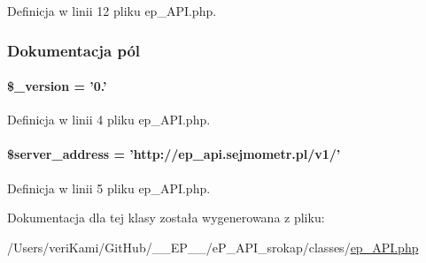 Definicja w linii 12 pliku ep\-\_\-\-A\-P\-I.\-php.



\subsubsection{Dokumentacja pól}
\hypertarget{classep___api_a01caaf3772469caf98e39064bf5d7d8f}{
\paragraph[{\$\-\_\-version}]{\setlength{\rightskip}{0pt plus 5cm}\$\-\_\-version = '0.'}}\label{classep___api_a01caaf3772469caf98e39064bf5d7d8f}


Definicja w linii 4 pliku ep\-\_\-\-A\-P\-I.\-php.

\hypertarget{classep___api_affbb88357e7d111cab3d11d6623828b2}{
\paragraph[{\$server\-\_\-address}]{\setlength{\rightskip}{0pt plus 5cm}\$server\-\_\-address = 'http\-://ep\-\_\-api.\-sejmometr.\-pl/v1/'}}\label{classep___api_affbb88357e7d111cab3d11d6623828b2}


Definicja w linii 5 pliku ep\-\_\-\-A\-P\-I.\-php.



Dokumentacja dla tej klasy została wygenerowana z pliku\-:\begin{DoxyCompactItemize}
\item 
/\-Users/veri\-Kami/\-Git\-Hub/\-\_\-\-\_\-\-E\-P\-\_\-\-\_\-/e\-P\-\_\-\-A\-P\-I\-\_\-srokap/classes/\hyperlink{classes_2ep___a_p_i_8php}{ep\-\_\-\-A\-P\-I.\-php}\end{DoxyCompactItemize}
